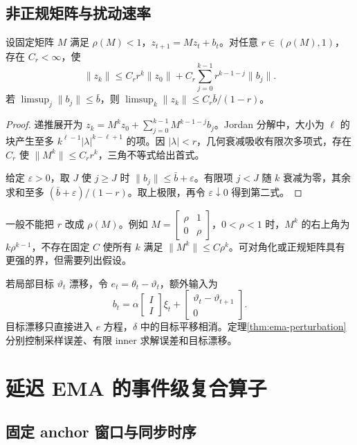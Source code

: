 \subsection{非正规矩阵与扰动速率}

\begin{theorem}[稳定联合系统的扰动界]
\label{thm:ema-perturbation}
设固定矩阵 $M$ 满足 $\rho(M)<1$，$z_{t+1}=Mz_t+b_t$。对任意 $r\in(\rho(M),1)$，存在 $C_r<\infty$，使
\[
 \|z_k\|\le C_rr^k\|z_0\|
 +C_r\sum_{j=0}^{k-1}r^{k-1-j}\|b_j\|.
\]
若 $\limsup_j\|b_j\|\le\bar b$，则 $\limsup_k\|z_k\|\le C_r\bar b/(1-r)$。
\end{theorem}
\begin{proof}
递推展开为 $z_k=M^kz_0+\sum_{j=0}^{k-1}M^{k-1-j}b_j$。Jordan 分解中，大小为 $\ell$ 的块产生至多 $k^{\ell-1}|\lambda|^{k-\ell+1}$ 的项。因 $|\lambda|<r$，几何衰减吸收有限次多项式，存在 $C_r$ 使 $\|M^k\|\le C_rr^k$，三角不等式给出首式。

给定 $\varepsilon>0$，取 $J$ 使 $j\ge J$ 时 $\|b_j\|\le\bar b+\varepsilon$。有限项 $j<J$ 随 $k$ 衰减为零，其余求和至多 $(\bar b+\varepsilon)/(1-r)$。取上极限，再令 $\varepsilon\downarrow0$ 得到第二式。
\end{proof}

一般不能把 $r$ 改成 $\rho(M)$。例如 $M=\begin{bmatrix}\rho&1\\0&\rho\end{bmatrix}$，$0<\rho<1$ 时，$M^k$ 的右上角为 $k\rho^{k-1}$，不存在固定 $C$ 使所有 $k$ 满足 $\|M^k\|\le C\rho^k$。可对角化或正规矩阵具有更强的界，但需要列出假设。

若局部目标 $\vartheta_t$ 漂移，令 $e_t=\theta_t-\vartheta_t$，额外输入为
\[
 b_t=\alpha\begin{bmatrix}I\\I\end{bmatrix}\xi_t
 +\begin{bmatrix}\vartheta_t-\vartheta_{t+1}\\0\end{bmatrix}.
\]
目标漂移只直接进入 $e$ 方程，$\delta$ 中的目标平移相消。定理\ref{thm:ema-perturbation}分别控制采样误差、有限 inner 求解误差和目标漂移。

\section{延迟 EMA 的事件级复合算子}

\subsection{固定 anchor 窗口与同步时序}

